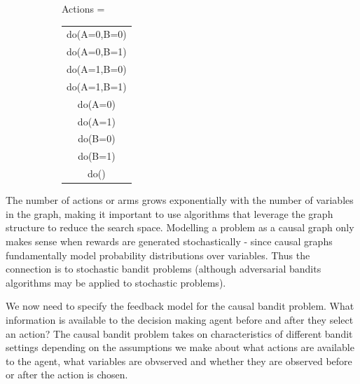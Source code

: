 \documentclass[11pt,a4paper,oneside]{book}
\begin{document}
\begin{figure}[h]
\caption{A simple causal graphical model and corresponding complete action space. A and B represent binary variables that can be intervened on and Y represents the reward.}
\label{fig:unify_frameworks}
\centering
\begin{subfigure}[c]{0.3\textwidth}
\end{subfigure}
\begin{subfigure}[t]{0.4\textwidth}
Actions = \begin{tabular}{|c|}
	\hline
  do(A=0,B=0) \\
  do(A=0,B=1) \\
  do(A=1,B=0) \\
  do(A=1,B=1) \\
  \hline
  do(A=0) \\
  do(A=1) \\
  do(B=0) \\
  do(B=1) \\
  do() \\
  \hline
\end{tabular}
\end{subfigure}
\end{figure} 

The number of actions or arms grows exponentially with the number of variables in the graph,
making it important to use algorithms that leverage the graph structure to reduce the
search space. Modelling a problem as a causal graph only makes sense when rewards are generated stochastically - since causal graphs fundamentally model probability distributions over variables. Thus the connection is to stochastic bandit problems (although adversarial bandits algorithms may be applied to stochastic problems).

We now need to specify the feedback model for the causal bandit problem. What information is available to the decision making agent before and after they select an action? The causal bandit problem takes on characteristics of different bandit settings depending on the assumptions we make about what actions are available to the agent, what variables are obvserved and whether they are observed before or after the action is chosen. 
\end{document}
